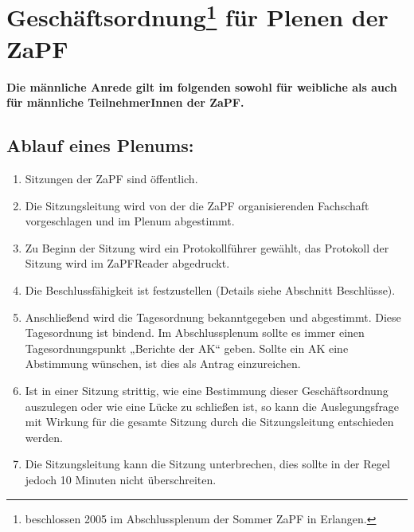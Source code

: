 




\chapter*{Geschäftsordnung\footnote{beschlossen 2005 im Abschlussplenum der Sommer ZaPF in Erlangen.} für Plenen der ZaPF}


\noindent \textbf{Die männliche Anrede gilt im folgenden sowohl für
weibliche als auch für männliche
 TeilnehmerInnen der ZaPF.}

\section{Ablauf eines Plenums:}

\begin{enumerate}
  \item Sitzungen der ZaPF sind öffentlich.
  \item Die Sitzungsleitung wird von der die ZaPF organisierenden Fachschaft vorgeschlagen und im Plenum abgestimmt.
  \item Zu Beginn der Sitzung wird ein Protokollführer gewählt, das Protokoll der Sitzung wird im ZaPFReader
        abgedruckt.
  \item Die Beschlussfähigkeit ist festzustellen (Details siehe Abschnitt Beschlüsse).
  \item Anschließend wird die Tagesordnung bekanntgegeben und abgestimmt. Diese Tagesordnung ist
        bindend. Im Abschlussplenum sollte es immer einen Tagesordnungspunkt „Berichte der AK“ geben.
        Sollte ein AK eine Abstimmung wünschen, ist dies als Antrag einzureichen.
  \item Ist in einer Sitzung strittig, wie eine Bestimmung dieser Geschäftsordnung auszulegen oder wie eine
        Lücke zu schließen ist, so kann die Auslegungsfrage mit Wirkung für die gesamte Sitzung durch die
        Sitzungsleitung entschieden werden.
  \item Die Sitzungsleitung kann die Sitzung unterbrechen, dies sollte in der Regel jedoch 10 Minuten nicht
        überschreiten.
\end{enumerate}

